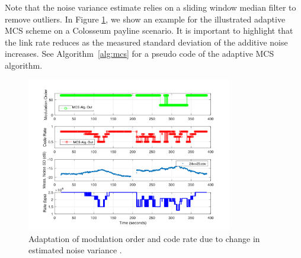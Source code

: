 \documentclass[11pt]{article}
\begin{document}
Note that the noise variance estimate relies on a sliding window median filter to remove outliers. In Figure \ref{fig:adaptivemcs}, we show an example for the illustrated adaptive MCS scheme on a Colosseum payline scenario. It is important to highlight that the link rate reduces as the measured standard deviation of the additive noise increases. See Algorithm~\ref{alg:mcs} for a pseudo code of the adaptive MCS algorithm.
\begin{figure} [htb]
     \centerline{
     \includegraphics[width = 0.8\textwidth]{Figures/MCS.png}}
     \caption{Adaptation of modulation order and code rate due to change in estimated noise variance \cite[Figure $8$]{func-report}.}
     \label{fig:adaptivemcs}
     \end{figure}
     
\end{document}
